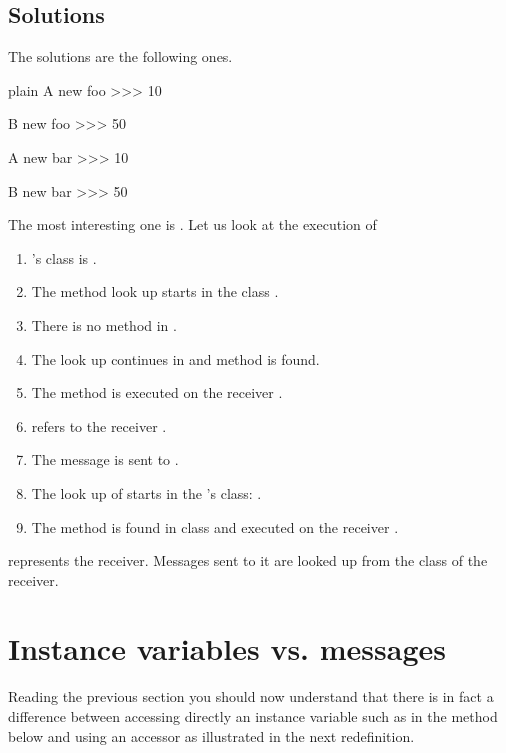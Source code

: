 \documentclass[10pt,twoside,english]{_support/latex/sbabook/sbabook}
\begin{document}
\subsection{Solutions}
The solutions are the following ones.

\begin{displaycode}{plain}
A new foo
>>> 10

B new foo
>>> 50

A new bar
>>> 10

B new bar
>>> 50
\end{displaycode}

The most interesting one is .  Let us look at the execution of 

\begin{enumerate}
\item {}'s class is .
\item The method look up starts in the class .
\item There is no method  in .
\item The look up continues in  and method  is found.
\item The method  is executed on the receiver  .
\item {} refers to the receiver .
\item The message  is sent to .
\item The look up of  starts in the 's class: .
\item The method  is found in class  and executed on the receiver .
\end{enumerate}

\begin{important}
 represents the receiver. Messages sent to it are looked up from the class of the receiver. 
\end{important}
\section{Instance variables vs. messages}
Reading the previous section you should now understand that there is in fact a difference between accessing directly an instance variable such as  in the method below and using an accessor as illustrated in the next redefinition. 
\end{document}

